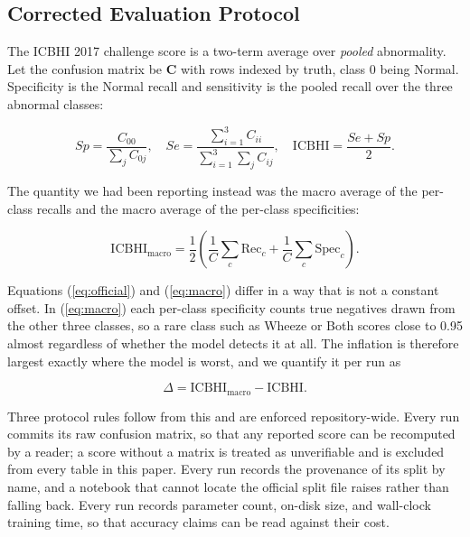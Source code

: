 \documentclass[journal,onecolumn]{IEEEtran}
\begin{document}
\subsection{Corrected Evaluation Protocol}
\label{subsec:protocol}

The ICBHI 2017 challenge score is a two-term average over \emph{pooled} abnormality.
Let the confusion matrix be $\mathbf{C}$ with rows indexed by truth, class $0$ being
Normal. Specificity is the Normal recall and sensitivity is the pooled recall over
the three abnormal classes:

\begin{equation}
\label{eq:official}
Sp = \frac{C_{00}}{\sum_{j} C_{0j}},
\quad
Se = \frac{\sum_{i=1}^{3} C_{ii}}{\sum_{i=1}^{3}\sum_{j} C_{ij}},
\quad
\mathrm{ICBHI} = \frac{Se + Sp}{2}.
\end{equation}

The quantity we had been reporting instead was the macro average of the per-class
recalls and the macro average of the per-class specificities:

\begin{equation}
\label{eq:macro}
\mathrm{ICBHI}_{\text{macro}}
= \frac{1}{2}\left( \frac{1}{C}\sum_{c} \mathrm{Rec}_c + \frac{1}{C}\sum_{c} \mathrm{Spec}_c \right).
\end{equation}

Equations (\ref{eq:official}) and (\ref{eq:macro}) differ in a way that is not a
constant offset. In (\ref{eq:macro}) each per-class specificity counts true negatives
drawn from the other three classes, so a rare class such as Wheeze or Both scores
close to 0.95 almost regardless of whether the model detects it at all. The
inflation is therefore largest exactly where the model is worst, and we quantify it
per run as

\begin{equation}
\label{eq:delta}
\Delta = \mathrm{ICBHI}_{\text{macro}} - \mathrm{ICBHI}.
\end{equation}

Three protocol rules follow from this and are enforced repository-wide. Every run
commits its raw confusion matrix, so that any reported score can be recomputed by a
reader; a score without a matrix is treated as unverifiable and is excluded from
every table in this paper. Every run records the provenance of its split by name, and
a notebook that cannot locate the official split file raises rather than falling back.
Every run records parameter count, on-disk size, and wall-clock training time, so
that accuracy claims can be read against their cost.
\end{document}
